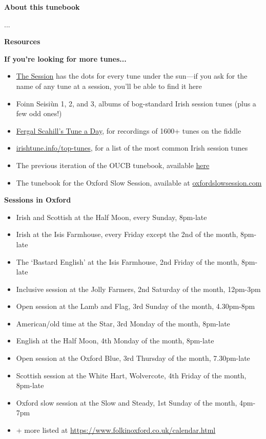 \documentclass[11pt]{article}
\begin{document}
\centerline{\Large\textbf{About this tunebook}}
...
\vspace{2\baselineskip}

\centerline{\Large\textbf{Resources}}
\textbf{If you're looking for more tunes...}
\begin{itemize}
    \item \href{https://thesession.org/}{The Session} has the dots for every tune under the sun---if you ask for the name of any tune at a session, you'll be able to find it here
    \item Foinn Seisi\`un 1, 2, and 3, albums of bog-standard Irish session tunes (plus a few odd ones!)
    \item \href{https://youtube.com/playlist?list=PL8B7WrVadMy6TUR_PLEKXhglaretoOnHy&si=mwThMCrgtDoPArmO}{Fergal Scahill's Tune a Day}, for recordings of 1600+ tunes on the fiddle
    \item \href{https://www.irishtune.info/top-tunes/}{irishtune.info/top-tunes}, for a list of the most common Irish session tunes
    \item The previous iteration of the OUCB tunebook, available \href{...}{here}
    \item The tunebook for the Oxford Slow Session, available at \href{https://oxfordslowsession.com/}{oxfordslowsession.com}
\end{itemize}

\textbf{Sessions in Oxford}
\begin{itemize}
    \item Irish and Scottish at the Half Moon, every Sunday, 8pm-late
    \item Irish at the Isis Farmhouse, every Friday except the 2nd of the month, 8pm-late
    \item The `Bastard English' at the Isis Farmhouse, 2nd Friday of the month, 8pm-late
    \item Inclusive session at the Jolly Farmers, 2nd Saturday of the month, 12pm-3pm
    \item Open session at the Lamb and Flag, 3rd Sunday of the month, 4.30pm-8pm
    \item American/old time at the Star, 3rd Monday of the month, 8pm-late
    \item English at the Half Moon, 4th Monday of the month, 8pm-late
    \item Open session at the Oxford Blue, 3rd Thursday of the month, 7.30pm-late
    \item Scottish session at the White Hart, Wolvercote, 4th Friday of the month, 8pm-late
    \item Oxford slow session at the Slow and Steady, 1st Sunday of the month, 4pm-7pm
    \item + more listed at \url{https://www.folkinoxford.co.uk/calendar.html}
\end{itemize}
\end{document}
